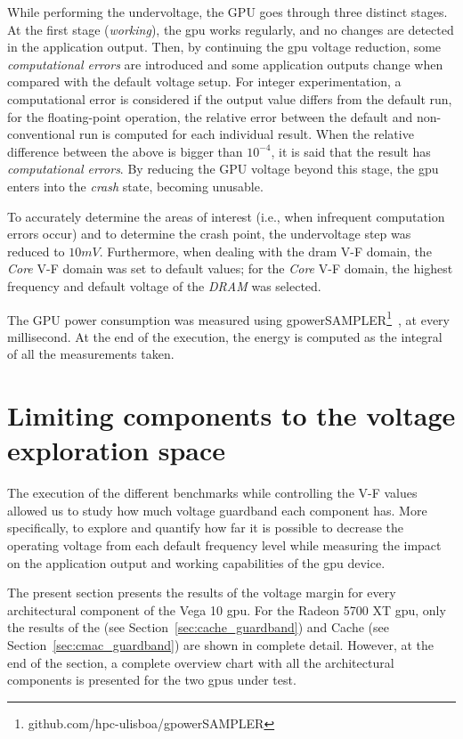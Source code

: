 While performing the undervoltage, the GPU goes through three distinct stages. At the first stage (\textit{working}), the \acrshort{gpu} works regularly, and no changes are detected in the application output. Then, by continuing the \acrshort{gpu} voltage reduction, some \textit{computational errors} are introduced and some application outputs change when compared with the default voltage setup. For integer experimentation, a computational error is considered if the output value differs from the default run, for the floating-point operation, the relative error between the default and non-conventional run is computed for each individual result. When the relative difference between the above is bigger than $10^{-4}$, it is said that the result has \textit{computational errors}.
By reducing the GPU voltage beyond this stage, the \acrshort{gpu} enters into the \textit{crash} state, becoming unusable.

To accurately determine the areas of interest (i.e., when infrequent computation errors occur) and to determine the crash point, the undervoltage step was reduced to $10mV$. Furthermore, when dealing with the \acrshort{dram} V-F domain, the \textit{Core} V-F domain was set to default values; for the \textit{Core} V-F domain, the highest frequency and default voltage of the \textit{DRAM} was selected. 

The GPU power consumption was measured using gpowerSAMPLER\footnote{github.com/hpc-ulisboa/gpowerSAMPLER}~\cite{guerreiro_gpgpu_2018}, at every millisecond. At the end of the execution, the energy is computed as the integral of all the measurements taken. 

\section{Limiting components to the voltage exploration space}
\label{sec:limiting_components}

The execution of the different benchmarks while controlling the V-F values allowed us to study how much voltage guardband each component has. More specifically, to explore and quantify how far it is possible to decrease the operating voltage from each default frequency level while measuring the impact on the application output and working capabilities of the \acrshort{gpu} device. 


The present section presents the results of the voltage margin for every architectural component of the Vega 10 \acrshort{gpu}. For the Radeon 5700 XT \acrshort{gpu}, only the results of the  (see Section~\ref{sec:cache_guardband}) and Cache (see Section~\ref{sec:cmac_guardband}) are shown in complete detail. However, at the end of the section, a complete overview chart with all the architectural components is presented for the two \acrshort{gpu}s under test.


